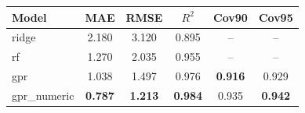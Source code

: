 \begin{tabular}{lccccc}
\toprule
\textbf{Model} & \textbf{MAE} & \textbf{RMSE} & \textbf{$R^2$} & \textbf{Cov90} & \textbf{Cov95} \\
\midrule
ridge & 2.180 & 3.120 & 0.895 & -- & -- \\
rf & 1.270 & 2.035 & 0.955 & -- & -- \\
gpr & 1.038 & 1.497 & 0.976 & \textbf{0.916} & 0.929 \\
gpr\_numeric & \textbf{0.787} & \textbf{1.213} & \textbf{0.984} & 0.935 & \textbf{0.942} \\
\bottomrule
\end{tabular}
